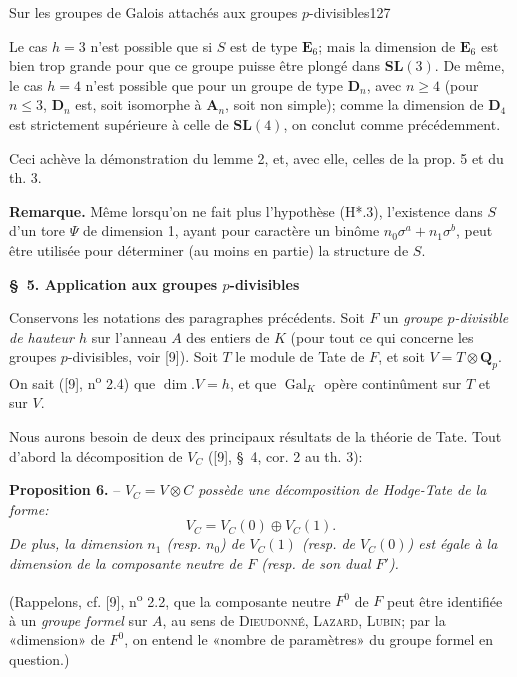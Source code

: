 Sur les groupes de Galois attachés aux groupes $p$-divisibles\hfill 127

Le cas $h=3$ n'est possible que si $S$ est de type $\mathbf E_6$; mais la dimension de $\mathbf E_6$ est bien trop grande pour que ce groupe puisse être plongé dans $\mathbf{SL}(3)$. De même, le cas $h=4$ n'est possible que pour un groupe de type $\mathbf D_n$, avec $n\geq4$ (pour $n\leq3$, $\mathbf D_n$ est, soit isomorphe à $\mathbf A_n$, soit non simple); comme la dimension de $\mathbf D_4$ est strictement supérieure à celle de $\mathbf{SL}(4)$, on conclut comme précédemment.

Ceci achève la démonstration du lemme 2, et, avec elle, celles de la prop. 5 et du th. 3.

\textbf{Remarque.} Même lorsqu'on ne fait plus l'hypothèse (H*.3), l'existence dans $S$ d'un tore $\Psi$ de dimension 1, ayant pour caractère un binôme $n_0\sigma^a+n_1\sigma^b$, peut être utilisée pour déterminer (au moins en partie) la structure de $S$.

\begin{center}\textbf{\S\ 5. Application aux groupes $p$-divisibles}\end{center}

Conservons les notations des paragraphes précédents. Soit $F$ un \textit{groupe $p$-divisible de hauteur $h$} sur l'anneau $A$ des entiers de $K$ (pour tout ce qui concerne les groupes $p$-divisibles, voir [9]). Soit $T$ le module de Tate de $F$, et soit $V=T\otimes\mathbf Q_p$. On sait ([9], n\textsuperscript{o} 2.4) que $\dim.V=h$, et que $\operatorname{Gal}_K$ opère continûment sur $T$ et sur $V$.

Nous aurons besoin de deux des principaux résultats de la théorie de Tate. Tout d'abord la décomposition de $V_C$ ([9], \S\ 4, cor. 2 au th. 3):

\textbf{Proposition 6.} -- \textit{$V_C=V\otimes C$ possède une décomposition de Hodge-Tate de la forme:}
\[
V_C=V_C(0)\oplus V_C(1).
\]
\textit{De plus, la dimension $n_1$ (resp. $n_0$) de $V_C(1)$ (resp. de $V_C(0)$) est égale à la dimension de la composante neutre de $F$ (resp. de son dual $F'$).}

(Rappelons, cf. [9], n\textsuperscript{o} 2.2, que la composante neutre $F^0$ de $F$ peut être identifiée à un \textit{groupe formel} sur $A$, au sens de \textsc{Dieudonné}, \textsc{Lazard}, \textsc{Lubin}; par la «dimension» de $F^0$, on entend le «nombre de paramètres» du groupe formel en question.)

